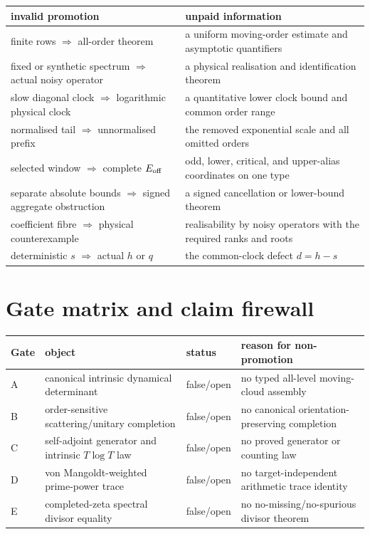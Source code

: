 \documentclass[11pt]{article}
\theoremstyle{definition}
\theoremstyle{remark}
\newcommand{\Eoff}{E_{\rm off}}
\begin{document}
\begin{center}
\small
\begin{tabular}{>{\raggedright\arraybackslash}p{4.1cm}>{\raggedright\arraybackslash}p{8.7cm}}
\toprule
invalid promotion & unpaid information \\
\midrule
finite rows $\Rightarrow$ all-order theorem & a uniform moving-order estimate and asymptotic quantifiers \\
fixed or synthetic spectrum $\Rightarrow$ actual noisy operator & a physical realisation and identification theorem \\
slow diagonal clock $\Rightarrow$ logarithmic physical clock & a quantitative lower clock bound and common order range \\
normalised tail $\Rightarrow$ unnormalised prefix & the removed exponential scale and all omitted orders \\
selected window $\Rightarrow$ complete $\Eoff$ & odd, lower, critical, and upper-alias coordinates on one type \\
separate absolute bounds $\Rightarrow$ signed aggregate obstruction & a signed cancellation or lower-bound theorem \\
coefficient fibre $\Rightarrow$ physical counterexample & realisability by noisy operators with the required ranks and roots \\
deterministic $s$ $\Rightarrow$ actual $h$ or $q$ & the common-clock defect $d=h-s$ \\
\bottomrule
\end{tabular}
\end{center}

\section{Gate matrix and claim firewall}

\begin{center}
\begin{tabular}{>{\raggedright\arraybackslash}p{1.0cm}>{\raggedright\arraybackslash}p{4.0cm}>{\raggedright\arraybackslash}p{2.0cm}>{\raggedright\arraybackslash}p{6.2cm}}
\toprule
Gate & object & status & reason for non-promotion \\
\midrule
A & canonical intrinsic dynamical determinant & false/open & no typed all-level moving-cloud assembly \\
B & order-sensitive scattering/unitary completion & false/open & no canonical orientation-preserving completion \\
C & self-adjoint generator and intrinsic $T\log T$ law & false/open & no proved generator or counting law \\
D & von Mangoldt-weighted prime-power trace & false/open & no target-independent arithmetic trace identity \\
E & completed-zeta spectral divisor equality & false/open & no no-missing/no-spurious divisor theorem \\
\bottomrule
\end{tabular}
\end{center}
\end{document}
